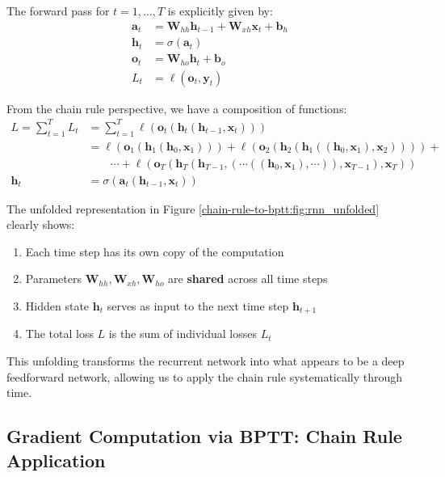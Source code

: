 \begin{notechapter}
The forward pass for $t=1,\dots,T$ is explicitly given by:
\begin{align*}
    \mathbf{a}_t &= \mathbf{W}_{hh} \mathbf{h}_{t-1} + \mathbf{W}_{xh} \mathbf{x}_t + \mathbf{b}_h \\
    \mathbf{h}_t &= \sigma(\mathbf{a}_t) \\
    \mathbf{o}_t &= \mathbf{W}_{ho} \mathbf{h}_t + \mathbf{b}_o \\
    L_t &= \ell(\mathbf{o}_t, \mathbf{y}_t)
\end{align*}

From the chain rule perspective, we have a composition of functions:
\begin{align*}
    L = \sum_{t=1}^{T} L_t &= \sum_{t=1}^{T} \ell(\mathbf{o}_t(\mathbf{h}_t(\mathbf{h}_{t-1}, \mathbf{x}_t))) \\
    &= \ell(\mathbf{o}_{1}(\mathbf{h}_{1}(\mathbf{h}_{0}, \mathbf{x}_{1}))) + 
    \ell(\mathbf{o}_{2}(\mathbf{h}_{2}(\mathbf{h}_{1}((\mathbf{h}_{0}, \mathbf{x}_{1}), \mathbf{x}_{2})))) + \\
    & \qquad \cdots +
    \ell(\mathbf{o}_T(\mathbf{h}_T(\mathbf{h}_{T-1}, (\cdots ((\mathbf{h}_{0}, \mathbf{x}_{1}), \cdots)),
    \mathbf{x}_{T-1}), \mathbf{x}_{T})) \\
    \mathbf{h}_t &= \sigma(\mathbf{a}_t(\mathbf{h}_{t-1}, \mathbf{x}_t))
\end{align*}

The unfolded representation in Figure \ref{chain-rule-to-bptt:fig:rnn_unfolded} clearly shows:
\begin{enumerate}
    \item Each time step has its own copy of the computation
    \item Parameters $\mathbf{W}_{hh}, \mathbf{W}_{xh}, \mathbf{W}_{ho}$ are \textbf{shared} across all time steps
    \item Hidden state $\mathbf{h}_t$ serves as input to the next time step $\mathbf{h}_{t+1}$
    \item The total loss $L$ is the sum of individual losses $L_t$
\end{enumerate}

This unfolding transforms the recurrent network into what appears to be a
deep feedforward network, allowing us to apply the chain rule systematically
through time.

\subsection{Gradient Computation via BPTT: Chain Rule Application}


\end{notechapter}
